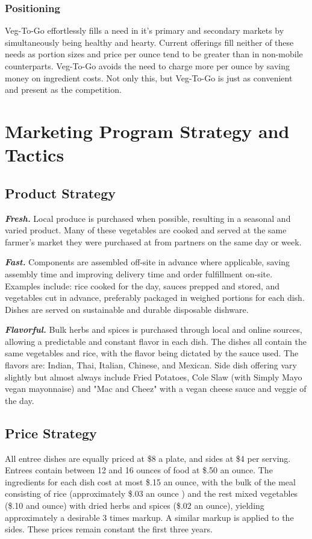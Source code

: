 \documentclass[12pt, letterpaper]{article}
\newcommand{\companyname}{Veg-To-Go}
\begin{document}
\subsubsection{Positioning}
\companyname{} effortlessly fills a need in it's primary and secondary markets by simultaneously being healthy and hearty.  Current offerings fill neither of these needs as portion sizes and price per ounce tend to be greater than in non-mobile counterparts. \companyname{} avoids the need to charge more per ounce by saving money on ingredient costs.  Not only this, but \companyname{} is just as convenient and present as the competition.

\section{Marketing Program Strategy and Tactics}
\subsection{Product Strategy}
\textbf{\emph{Fresh.}} Local produce is purchased when possible, resulting in a seasonal and varied product. Many of these vegetables are cooked and served at the same farmer's market they were purchased at from partners on the same day or week.

\textbf{\emph{Fast.}} Components are assembled off-site in advance where applicable, saving assembly time and improving delivery time and order fulfillment on-site. Examples include: rice cooked for the day, sauces prepped and stored, and vegetables cut in advance, preferably packaged in weighed portions for each dish. Dishes are served on sustainable and durable disposable dishware.

\textbf{\emph{Flavorful.}} Bulk herbs and spices is purchased through local and online sources, allowing a predictable and constant flavor in each dish.  The dishes  all contain the same vegetables and rice, with the flavor being dictated by the sauce used.  The flavors are: Indian, Thai, Italian, Chinese, and Mexican. Side dish offering vary slightly but almost always include Fried Potatoes, Cole Slaw (with Simply Mayo\textregistered{} vegan mayonnaise) and "Mac and Cheez" with a vegan cheese sauce and veggie of the day.
\subsection{Price Strategy}
All entree dishes are equally priced at \$8 a plate, and sides at \$4 per serving. Entrees contain between 12 and 16 ounces of food at \$.50 an ounce. The ingredients for each dish cost at most \$.15 an ounce, with the bulk of the meal consisting of rice (approximately \$.03 an ounce \cite{costs}) and the rest mixed vegetables (\$.10 and ounce) with dried herbs and spices (\$.02 an ounce), yielding approximately a desirable 3 times markup. A similar markup is applied to the sides.  These prices remain constant the first three years.
\end{document}
